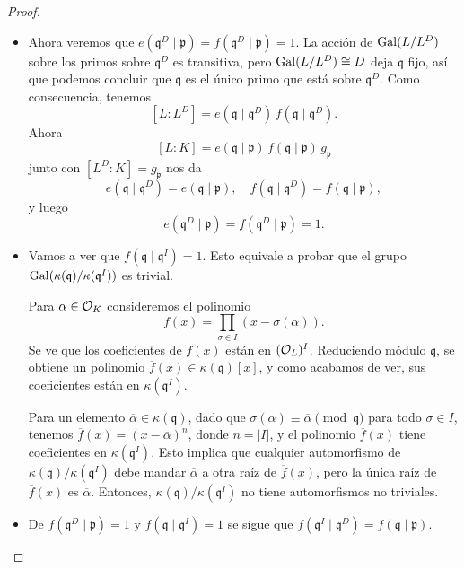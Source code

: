 \begin{teorema}
\begin{proof}
\begin{itemize}
      \item Ahora veremos que
        $e (\mathfrak{q}^D\mid\mathfrak{p}) = f (\mathfrak{q}^D\mid\mathfrak{p}) = 1$.
        La acción de $\operatorname{Gal} (L/L^D)$ sobre los primos sobre $\mathfrak{q}^D$ es
        transitiva, pero $\operatorname{Gal} (L/L^D) \cong D$ deja $\mathfrak{q}$ fijo, así que
        podemos concluir que $\mathfrak{q}$ es el único primo que está sobre
        $\mathfrak{q}^D$. Como consecuencia, tenemos
        $$[L : L^D] = e (\mathfrak{q}\mid\mathfrak{q}^D) \, f (\mathfrak{q}\mid\mathfrak{q}^D).$$
        Ahora
        $$[L : K] = e (\mathfrak{q}\mid\mathfrak{p}) \, f (\mathfrak{q}\mid\mathfrak{p}) \, g_\mathfrak{p}$$
        junto con $[L^D : K] = g_\mathfrak{p}$ nos da
        \[ e (\mathfrak{q}\mid\mathfrak{q}^D) = e (\mathfrak{q}\mid\mathfrak{p}), \quad
           f (\mathfrak{q}\mid\mathfrak{q}^D) = f (\mathfrak{q}\mid\mathfrak{p}), \]
        y luego
        $$e (\mathfrak{q}^D\mid\mathfrak{p}) = f (\mathfrak{q}^D\mid\mathfrak{p}) = 1.$$

      \item Vamos a ver que $f (\mathfrak{q}\mid\mathfrak{q}^I) = 1$. Esto
        equivale a probar que el grupo
        $\operatorname{Gal} (\kappa (\mathfrak{q})/\kappa (\mathfrak{q}^I))$ es trivial.

        Para $\alpha \in \mathcal{O}_K$ consideremos el polinomio
        $$f (x) = \prod_{\sigma \in I} (x - \sigma (\alpha)).$$
        Se ve que los coeficientes de $f (x)$ están en $(\mathcal{O}_L)^I$. Reduciendo módulo
        $\mathfrak{q}$, se obtiene un polinomio
        $\overline{f} (x) \in \kappa (\mathfrak{q}) [x]$, y como acabamos de ver, sus
        coeficientes están en $\kappa (\mathfrak{q}^I)$.

        Para un elemento $\overline{\alpha} \in \kappa (\mathfrak{q})$, dado que
        $\sigma (\alpha) \equiv \overline{\alpha} \pmod{\mathfrak{q}}$ para todo
        $\sigma \in I$, tenemos $\overline{f} (x) = (x - \overline{\alpha})^n$,
        donde $n = |I|$, y el polinomio $\overline{f} (x)$ tiene coeficientes en
        $\kappa (\mathfrak{q}^I)$. Esto implica que cualquier automorfismo de
        $\kappa (\mathfrak{q})/\kappa (\mathfrak{q}^I)$ debe mandar
        $\overline{\alpha}$ a otra raíz de $\overline{f} (x)$, pero la única
        raíz de $\overline{f} (x)$ es $\overline{\alpha}$. Entonces, $\kappa
        (\mathfrak{q})/\kappa (\mathfrak{q}^I)$ no tiene automorfismos no
        triviales.

      \item De $f (\mathfrak{q}^D\mid\mathfrak{p}) = 1$ y
        $f (\mathfrak{q}\mid\mathfrak{q}^I) = 1$ se sigue que
        $f (\mathfrak{q}^I\mid\mathfrak{q}^D) = f (\mathfrak{q}\mid\mathfrak{p})$.


\end{itemize}
\end{proof}
\end{teorema}
